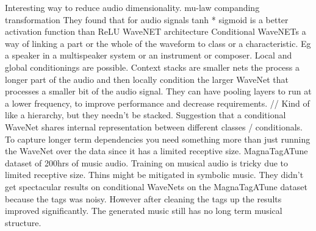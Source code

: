 \cite{Oord2016} Interesting way to reduce audio dimensionality. mu-law companding transformation They found that for audio signals tanh * sigmoid is a better activation function than ReLU WaveNET architecture Conditional WaveNETs a way of linking a part or the whole of the waveform to class or a characteristic. Eg a speaker in a multispeaker system or an instrument or composer. Local and global conditionings are possible. Context stacks are smaller nets the process a longer part of the audio and then locally condition the larger WaveNet that processes a smaller bit of the audio signal. They can have pooling layers to run at a lower frequency, to improve performance and decrease requirements. // Kind of like a hierarchy, but they needn't be stacked. Suggestion that a conditional WaveNet shares internal representation between different classes / conditionals. To capture longer term dependencies you need something more than just running the WaveNet over the data since it has a limited receptive size. MagnaTagATune dataset of 200hrs of music audio. Training on musical audio is tricky due to limited receptive size. Thins might be mitigated in symbolic music. They didn't get spectacular results on conditional WaveNets on the MagnaTagATune dataset because the tags was noisy. However after cleaning the tags up the results improved significantly. The generated music still has no long term musical structure.

